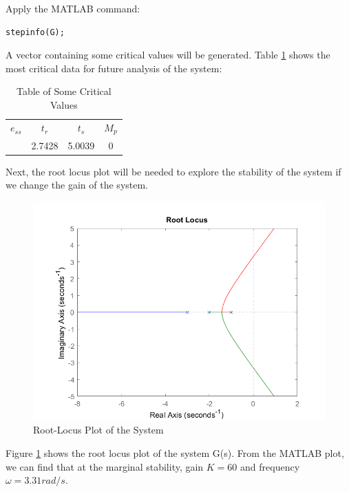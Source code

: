\documentclass[a4paper, twocolumn, titlepage, 10pt]{article}
\begin{document}
		Apply the MATLAB command:
		\begin{lstlisting}[frame = single]
	stepinfo(G);
		\end{lstlisting}
		A vector containing some critical values will be generated. Table \ref{trtsmptable} shows the most critical data for future analysis of the system:
		\begin{table}[H]
			\centering
			\begin{tabular}{c c c c}
				$e_{ss}$ & $t_r$ & $t_s$ & $M_p$ \\
				 & 2.7428 & 5.0039 & 0
			\end{tabular}
			\caption{Table of Some Critical Values}
			\label{trtsmptable}
		\end{table}
		
		Next, the root locus plot will be needed to explore the stability of the system if we change the gain of the system.
		\begin{figure}[H]
			\centering
			\includegraphics[width=\linewidth]{rlocus}
			\caption{Root-Locus Plot of the System}
			\label{rlocusG}
		\end{figure}
		
		Figure \ref{rlocusG} shows the root locus plot of the system G(s). From the MATLAB plot, we can find that at the marginal stability, gain $K = 60$ and frequency $\omega = 3.31 rad/s$.
		
\end{document}
